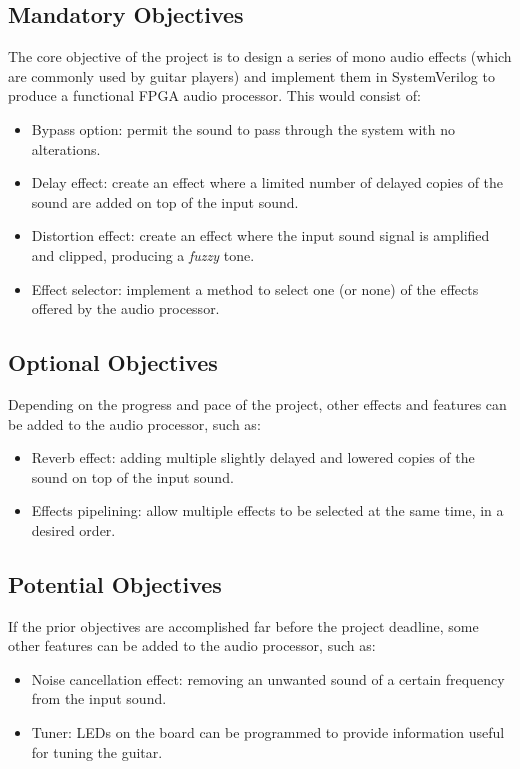 

\subsection*{Mandatory Objectives}
The core objective of the project is to design a series of mono audio effects (which are commonly used by guitar players) and implement them in SystemVerilog to produce a functional FPGA audio processor. This would consist of:
\begin{itemize}
    \item Bypass option: permit the sound to pass through the system with no alterations.
    \item Delay effect: create an effect where a limited number of delayed copies of the sound are added on top of the input sound.
    \item Distortion effect: create an effect where the input sound signal is amplified and clipped, producing a \textit{fuzzy} tone.
    \item Effect selector: implement a method to select one (or none) of the effects offered by the audio processor.
\end{itemize}

\subsection*{Optional Objectives}
Depending on the progress and pace of the project, other effects and features can be added to the audio processor, such as:
\begin{itemize}
    \item Reverb effect: adding multiple slightly delayed and lowered copies of the sound on top of the input sound.
    \item Effects pipelining: allow multiple effects to be selected at the same time, in a desired order.
\end{itemize}

\subsection*{Potential Objectives}
If the prior objectives are accomplished far before the project deadline, some other features can be added to the audio processor, such as:
\begin{itemize}
    \item Noise cancellation effect: removing an unwanted sound of a certain frequency from the input sound.
    \item Tuner: LEDs on the board can be programmed to provide information useful for tuning the guitar.
\end{itemize}